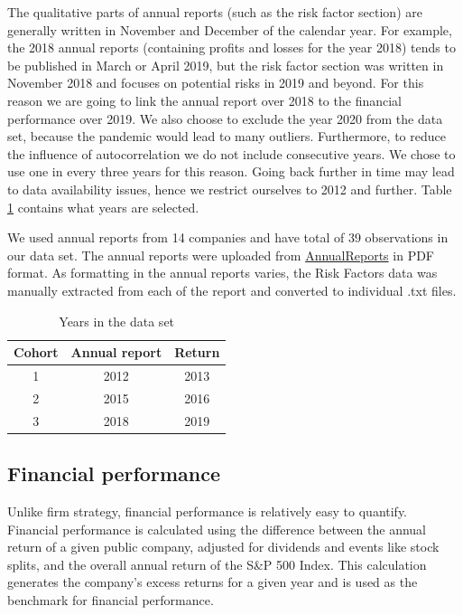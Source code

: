 \documentclass{article}
\begin{document}
The qualitative parts of annual reports (such as the risk factor section) are generally written in November and December of the calendar year. For example, the 2018 annual reports (containing profits and losses for the year 2018) tends to be published in March or April 2019, but the risk factor section was written in November 2018 and focuses on potential risks in 2019 and beyond. For this reason we are going to link the annual report over 2018 to the financial performance over 2019. We also choose to exclude the year 2020 from the data set, because the pandemic would lead to many outliers. Furthermore, to reduce the influence of autocorrelation we do not include consecutive years. We chose to use one in every three years for this reason. Going back further in time may lead to data availability issues, hence we restrict ourselves to 2012 and further. Table \ref{tab:data_cohorts} contains what years are selected.

We used annual reports from 14 companies and have total of 39 observations in our data set. The annual reports were uploaded from \href{https://www.annualreports.com/}{AnnualReports} in PDF format. As formatting in the annual reports varies, the Risk Factors data was manually extracted from each of the report and converted to individual .txt files. 

\begin{table}[h]
    \centering
    \begin{tabular}{c|c|c}
        \textbf{Cohort} & \textbf{Annual report} & \textbf{Return} \\
        \hline
         1 & 2012 & 2013 \\
         2 & 2015 & 2016 \\
         3 & 2018 & 2019
    \end{tabular}
    \caption{Years in the data set}
    \label{tab:data_cohorts}
\end{table}

\subsection{Financial performance}
Unlike firm strategy, financial performance is relatively easy to quantify. Financial performance is calculated using the difference between the annual return of a given public company, adjusted for dividends and events like stock splits, and the overall annual return of the S\&P 500 Index. This calculation generates the company's excess returns for a given year and is used as the benchmark for financial performance.
\end{document}
